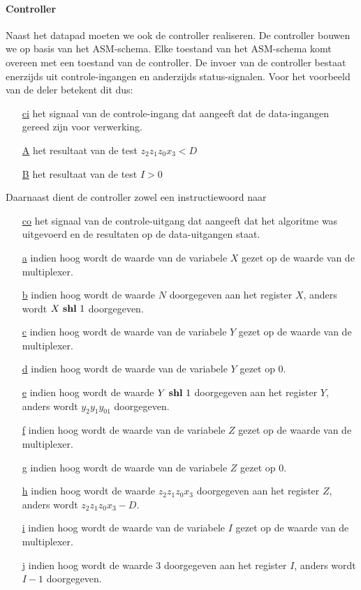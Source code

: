 \paragraph{Controller}
Naast het datapad moeten we ook de controller realiseren. De controller bouwen we op basis van het ASM-schema. Elke toestand van het ASM-schema komt overeen met een toestand van de controller. De invoer van de controller bestaat enerzijds uit controle-ingangen en anderzijds status-signalen. Voor het voorbeeld van de deler betekent dit dus:
\begin{enumerate}
 \item [\underline{ci}] het signaal van de controle-ingang dat aangeeft dat de data-ingangen gereed zijn voor verwerking.
 \item [\underline{A}] het resultaat van de test $z_2z_1z_0x_3<D$
 \item [\underline{B}] het resultaat van de test $I>0$
\end{enumerate}
Daarnaast dient de controller zowel een instructiewoord naar
\begin{enumerate}
 \item[\underline{co}] het signaal van de controle-uitgang dat aangeeft dat het algoritme was uitgevoerd en de resultaten op de data-uitgangen staat.
 \item[\underline{a}] indien hoog wordt de waarde van de variabele $X$ gezet op de waarde van de multiplexer.
 \item[\underline{b}] indien hoog wordt de waarde $N$ doorgegeven aan het register $X$, anders wordt $X\mbox{ \textbf{shl} }1$ doorgegeven.
 \item[\underline{c}] indien hoog wordt de waarde van de variabele $Y$ gezet op de waarde van de multiplexer.
 \item[\underline{d}] indien hoog wordt de waarde van de variabele $Y$ gezet op 0.
 \item[\underline{e}] indien hoog wordt de waarde $Y\mbox{ \textbf{shl} }1$ doorgegeven aan het register $Y$, anders wordt $y_2y_1y_01$ doorgegeven.
 \item[\underline{f}] indien hoog wordt de waarde van de variabele $Z$ gezet op de waarde van de multiplexer.
 \item[\underline{g}] indien hoog wordt de waarde van de variabele $Z$ gezet op 0.
 \item[\underline{h}] indien hoog wordt de waarde $z_2z_1z_0x_3$ doorgegeven aan het register $Z$, anders wordt $z_2z_1z_0x_3-D$.
 \item[\underline{i}] indien hoog wordt de waarde van de variabele $I$ gezet op de waarde van de multiplexer.
 \item[\underline{j}] indien hoog wordt de waarde $3$ doorgegeven aan het register $I$, anders wordt $I-1$ doorgegeven.
\end{enumerate}
